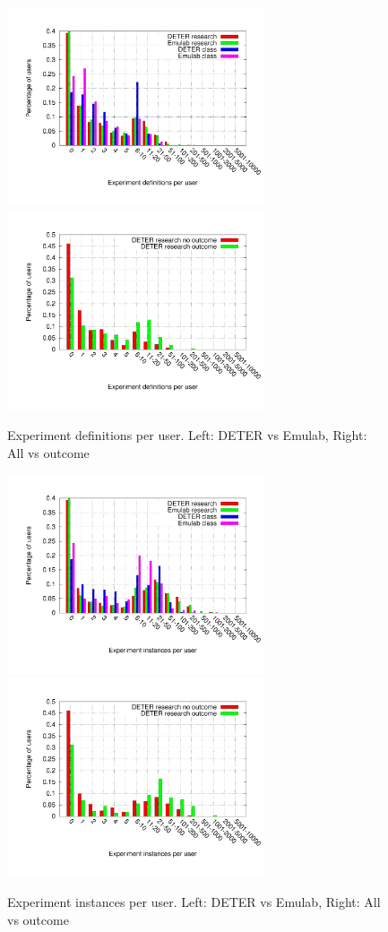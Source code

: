 \documentclass[10pt, twocolumn]{article} %
\begin{document}
\begin{figure}[htbp] \begin{center} \includegraphics[width=3in,
type=pdf,ext=.pdf,read=.pdf]{figs/user.exp.gnu}
\includegraphics[width=3in,
type=pdf,ext=.pdf,read=.pdf]{figs/user.exp.cmp.gnu} \caption{Experiment
definitions per user. Left: DETER vs Emulab, Right: All vs outcome}
\label{userexp} \end{center} \end{figure}

\begin{figure}[htbp] \begin{center} \includegraphics[width=3in,
type=pdf,ext=.pdf,read=.pdf]{figs/user.swaps.gnu}
\includegraphics[width=3in,
type=pdf,ext=.pdf,read=.pdf]{figs/user.swaps.cmp.gnu}
\caption{Experiment instances per user. Left: DETER vs Emulab, Right:
All vs outcome} \label{userswaps} \end{center} \end{figure}
\end{document}

